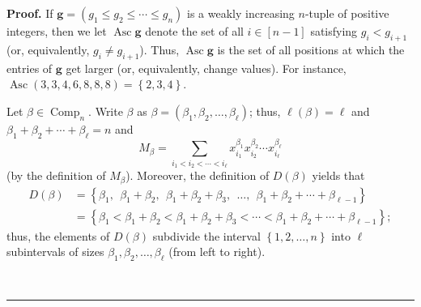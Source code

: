 \documentclass[numbers=enddot,12pt,final,onecolumn,notitlepage]{scrartcl}%
\theoremstyle{definition}
\newenvironment{proof}[1][Proof]{\noindent\textbf{#1.} }{\ \rule{0.5em}{0.5em}}
\let\sumnonlimits\sum
\renewcommand{\sum}{\sumnonlimits\limits}
\newenvironment{vershort}{}{}
\begin{document}
\begin{vershort}


\begin{proof}
If $\mathbf{g}=\left(  g_{1}\leq g_{2}\leq\cdots\leq g_{n}\right)  $ is a
weakly increasing $n$-tuple of positive integers, then we let
$\operatorname*{Asc}\mathbf{g}$ denote the set of all $i\in\left[  n-1\right]
$ satisfying $g_{i}<g_{i+1}$ (or, equivalently, $g_{i}\neq g_{i+1}$). Thus,
$\operatorname*{Asc}\mathbf{g}$ is the set of all positions at which the
entries of $\mathbf{g}$ get larger (or, equivalently, change values). For
instance, $\operatorname*{Asc}\left(  3,3,4,6,8,8,8\right)  =\left\{
2,3,4\right\}  $.

Let $\beta\in\operatorname*{Comp}\nolimits_{n}$. Write $\beta$ as
$\beta=\left(  \beta_{1},\beta_{2},\ldots,\beta_{\ell}\right)  $; thus,
$\ell\left(  \beta\right)  =\ell$ and $\beta_{1}+\beta_{2}+\cdots+\beta_{\ell
}=n$ and%
\begin{equation}
M_{\beta}=\sum_{i_{1}<i_{2}<\cdots<i_{\ell}}x_{i_{1}}^{\beta_{1}}x_{i_{2}%
}^{\beta_{2}}\cdots x_{i_{\ell}}^{\beta_{\ell}}
\label{pf.prop.eta.through-x.Mbeta=}%
\end{equation}
(by the definition of $M_{\beta}$). Moreover, the definition of $D\left(
\beta\right)  $ yields that
\begin{align*}
D\left(  \beta\right)   &  =\left\{  \beta_{1},\ \ \beta_{1}+\beta
_{2},\ \ \beta_{1}+\beta_{2}+\beta_{3},\ \ \ldots,\ \ \beta_{1}+\beta
_{2}+\cdots+\beta_{\ell-1}\right\} \\
&  =\left\{  \beta_{1}<\beta_{1}+\beta_{2}<\beta_{1}+\beta_{2}+\beta
_{3}<\cdots<\beta_{1}+\beta_{2}+\cdots+\beta_{\ell-1}\right\}  ;
\end{align*}
thus, the elements of $D\left(  \beta\right)  $ subdivide the interval
$\left\{  1,2,\ldots,n\right\}  $ into $\ell$ subintervals of sizes $\beta
_{1},\beta_{2},\ldots,\beta_{\ell}$ (from left to right).


\end{proof}
\end{vershort}
\end{document}
